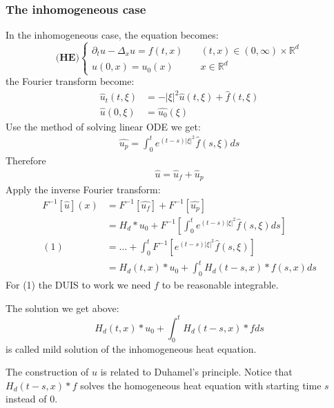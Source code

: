 \subsubsection*{The inhomogeneous case}
In the inhomogeneous case, the equation becomes:
\begin{equation} \label{HE:homogeneous}
\textbf{(HE)}\left\{
\begin{aligned}
	\partial_t u - \Delta_x u = f(t, x) \quad &(t, x) \in (0, \infty) \times \mathbb{R}^d\\
	u(0, x) = u_0(x) \quad &x \in \mathbb{R}^d
\end{aligned}
\right.	
\end{equation}
the Fourier transform become:
\begin{align*}
	\hat{u}_t(t, \xi) &= -|\xi|^2 \hat{u}(t, \xi) + \hat{f}(t, \xi) \\
	\hat{u}(0, \xi) &= \hat{u_0}(\xi)
\end{align*}
Use the method of solving linear ODE we get:
\begin{align*}
	\hat{u_p} = \int_0^t e^{(t - s)|\xi|^2} \hat{f}(s, \xi)ds
\end{align*}
Therefore
\begin{align*}
	\hat{u} = \hat{u}_f + \hat{u}_p
\end{align*}
Apply the inverse Fourier transform:
\begin{align*}
	F^{-1}[\hat{u}](x) &= F^{-1}[\hat{u_f}] + F^{-1}[\hat{u_p}]\\
	&= H_d*u_0 + F^{-1}[\int_0^t e^{(t-s)|\xi|^2} \hat{f}(s, \xi)ds]\\
 (1)&= \dots + \int_0^t F^{-1} [e^{(t-s)|\xi|^2} \hat{f}(s, \xi)]\\
 &= H_d(t, x)*u_0 + \int_0^t H_d(t-s, x)*f(s, x) ds
\end{align*}
For (1) the DUIS to work we need $f$ to be reasonable integrable.

\begin{definition}
The solution we get above:
\begin{equation}
	H_d(t, x)*u_0 + \int_0^t H_d(t-s, x)*f ds
\end{equation}
is called mild solution of the inhomogeneous heat equation.
\end{definition}
\begin{remark}
The construction of $u$ is related to Duhamel's principle. Notice that $H_d(t-s, x)*f$ solves the homogeneous heat equation with starting time $s$ instead of $0$.	
\end{remark}

